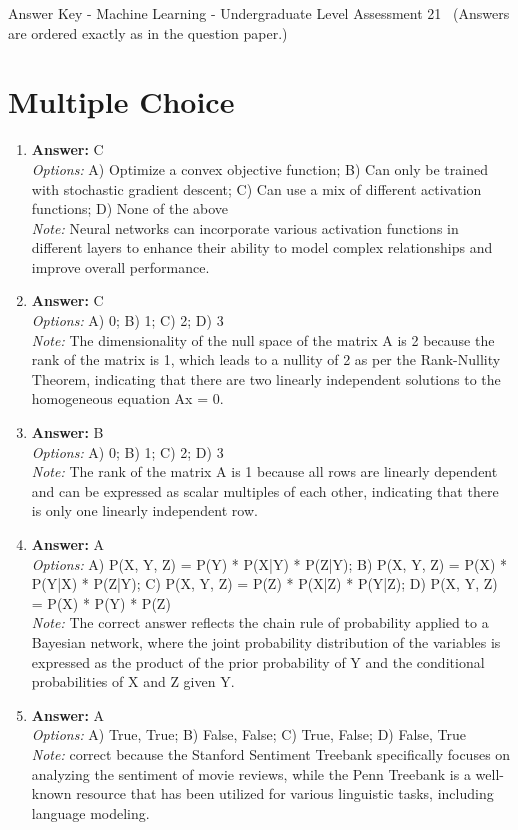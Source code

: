 \documentclass[12pt]{article}
\begin{document}
\begin{center}
Answer Key - Machine Learning - Undergraduate Level Assessment 21 \
\small (Answers are ordered exactly as in the question paper.)
\end{center}

\section*{Multiple Choice}
\begin{enumerate}[label=\arabic*.]
\item \textbf{Answer:} C
\\ \textit{Options:} A) Optimize a convex objective function; B) Can only be trained with stochastic gradient descent; C) Can use a mix of different activation functions; D) None of the above
\\ \textit{Note:} Neural networks can incorporate various activation functions in different layers to enhance their ability to model complex relationships and improve overall performance.
\item \textbf{Answer:} C
\\ \textit{Options:} A) 0; B) 1; C) 2; D) 3
\\ \textit{Note:} The dimensionality of the null space of the matrix A is 2 because the rank of the matrix is 1, which leads to a nullity of 2 as per the Rank-Nullity Theorem, indicating that there are two linearly independent solutions to the homogeneous equation Ax = 0.
\item \textbf{Answer:} B
\\ \textit{Options:} A) 0; B) 1; C) 2; D) 3
\\ \textit{Note:} The rank of the matrix A is 1 because all rows are linearly dependent and can be expressed as scalar multiples of each other, indicating that there is only one linearly independent row.
\item \textbf{Answer:} A
\\ \textit{Options:} A) P(X, Y, Z) = P(Y) * P(X|Y) * P(Z|Y); B) P(X, Y, Z) = P(X) * P(Y|X) * P(Z|Y); C) P(X, Y, Z) = P(Z) * P(X|Z) * P(Y|Z); D) P(X, Y, Z) = P(X) * P(Y) * P(Z)
\\ \textit{Note:} The correct answer reflects the chain rule of probability applied to a Bayesian network, where the joint probability distribution of the variables is expressed as the product of the prior probability of Y and the conditional probabilities of X and Z given Y.
\item \textbf{Answer:} A
\\ \textit{Options:} A) True, True; B) False, False; C) True, False; D) False, True
\\ \textit{Note:} correct because the Stanford Sentiment Treebank specifically focuses on analyzing the sentiment of movie reviews, while the Penn Treebank is a well-known resource that has been utilized for various linguistic tasks, including language modeling.
\end{enumerate}
\end{document}
